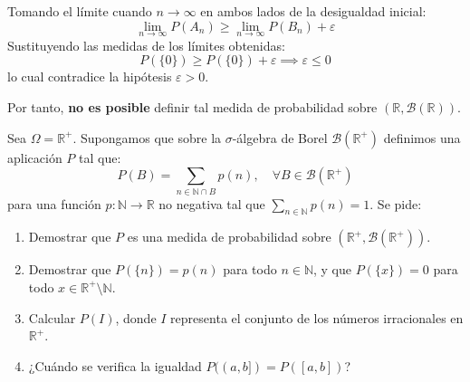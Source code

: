 \begin{problema}
Tomando el límite cuando $n \to \infty$ en ambos lados de la desigualdad inicial:
\[
    \lim_{n \to \infty} P(A_n) \ge \lim_{n \to \infty} P(B_n) + \varepsilon
\]
Sustituyendo las medidas de los límites obtenidas:
\[
    P(\{0\}) \ge P(\{0\}) + \varepsilon \implies \varepsilon \le 0
\]
lo cual contradice la hipótesis $\varepsilon > 0$.

Por tanto, \textbf{no es posible} definir tal medida de probabilidad sobre $(\mathbb{R}, \mathcal{B}(\mathbb{R}))$.
\end{problema}

\newpage

\begin{problema}
Sea $\Omega = \mathbb{R}^+$. Supongamos que sobre la $\sigma$-álgebra de Borel $\mathcal{B}(\mathbb{R}^+)$ definimos una aplicación $P$ tal que:
\[
    P(B) = \sum_{n \in \mathbb{N} \cap B} p(n), \quad \forall B \in \mathcal{B}(\mathbb{R}^+)
\]
para una función $p : \mathbb{N} \to \mathbb{R}$ no negativa tal que $\displaystyle \sum_{n \in \mathbb{N}} p(n) = 1$. Se pide:
\begin{enumerate}[label=\alph*)]
    \item Demostrar que $P$ es una medida de probabilidad sobre $(\mathbb{R}^+, \mathcal{B}(\mathbb{R}^+))$.
    \item Demostrar que $P(\{n\}) = p(n)$ para todo $n \in \mathbb{N}$, y que $P(\{x\}) = 0$ para todo $x \in \mathbb{R}^+ \setminus \mathbb{N}$.
    \item Calcular $P(I)$, donde $I$ representa el conjunto de los números irracionales en $\mathbb{R}^+$.
    \item ¿Cuándo se verifica la igualdad $P((a,b]) = P([a,b])$?
\end{enumerate}

\tcblower


\end{problema}
